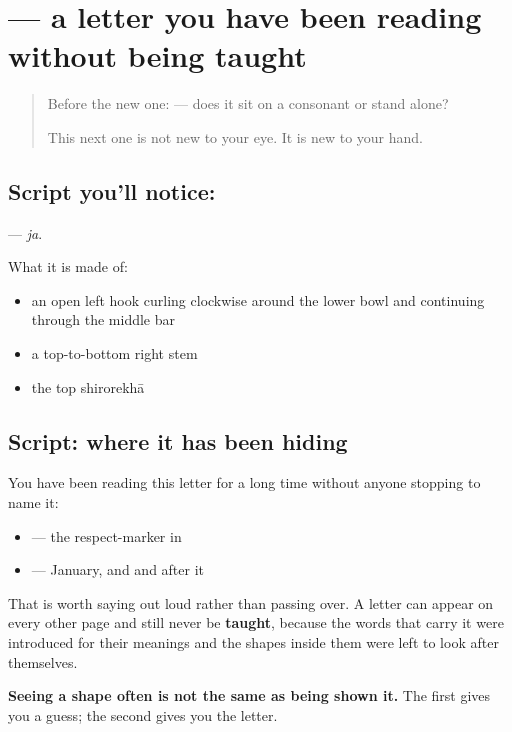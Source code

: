 \section[\texorpdfstring{\hi{ज} (ja)}{ज (ja)}]{ — a letter you have been reading without being taught}

\label{lesson:HI-S132-letter-ja}



\begin{quote}
Before the new one: \textbf{} — does it sit on a consonant or stand alone?

This next one is not new to your eye. It is new to your hand.
\end{quote}

\subsection*{Script you'll notice: }
\textbf{} — \emph{ja}.

What it is made of:

\begin{itemize}
\raggedright
  \item an open left hook curling clockwise around the lower bowl and continuing through the middle bar
  \item a top-to-bottom right stem
  \item the top shirorekhā
\end{itemize}

\subsection*{Script: where it has been hiding}
You have been reading this letter for a long time without anyone stopping to name it:

\begin{itemize}
\raggedright
  \item \textbf{} — the respect-marker in \textbf{ }
  \item \textbf{} — January, and \textbf{} and \textbf{} after it
\end{itemize}

That is worth saying out loud rather than passing over. A letter can appear on every other page and still never be \textbf{taught}, because the words that carry it were introduced for their meanings and the shapes inside them were left to look after themselves.

\textbf{Seeing a shape often is not the same as being shown it.} The first gives you a guess; the second gives you the letter.

